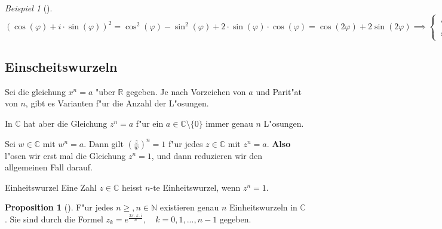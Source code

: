 \documentclass[11pt]{article}
\theoremstyle{remark}
\newtheorem{exa}{Beispiel}[section]
\theoremstyle{definition}
\newtheorem*{proposition}{Proposition}
\theoremstyle{remark}
\begin{document}
\begin{exa}[] \label{}\
\begin{equation*}
(\cos(\varphi)+i\cdot \sin(\varphi))^2 =\cos^2(\varphi)-\sin^2(\varphi)+2\cdot\sin(\varphi)\cdot\cos(\varphi) 
 = \cos(2\varphi) + 2\sin(2\varphi) 
 \implies 
\begin{cases}
\cos(2\varphi)=\cos^2(\varphi)-\sin^2(\varphi) \\
\sin(2\varphi)=2\cdot\sin(\varphi)\cdot\cos(\varphi)
\end{cases}
\end{equation*}
\end{exa}

\subsection{Einscheitswurzeln}
\label{sec:org0755105}
Sei die gleichung \(x^n=a\) "uber \(\mathbb{R}\) gegeben. Je nach Vorzeichen von
\(a\) und Parit"at von \(n\), gibt es Varianten f"ur die Anzahl der L"osungen.
\begin{relation}
In \(\mathbb{C}\) hat aber die Gleichung \(z^n=a\) f"ur ein \(a\in
\mathbb{C}\setminus \{0\}\) immer genau \(n\) L"osungen.
\end{relation}

Sei \(w\in \mathbb{C}\) mit \(w^n=a\). Dann gilt \((\frac{z}{w})^n=1\) f"ur jedes
\(z\in \mathbb{C}\) mit \(z^n=a\). \textbf{Also} l"osen wir erst mal die Gleichung \(z^n=1\),
und dann reduzieren wir den allgemeinen Fall darauf.

\begin{definition}{Einheitswurzel}{}
Eine Zahl \(z\in \mathbb{C}\) heisst \(n\text{-te}\) Einheitswurzel, wenn \(z^n=1\).
\end{definition}

\begin{proposition}[] \label{}
F"ur jedes \(n\geq, n\in\mathbb{N}\) existieren genau \(n\)
Einheitswurzeln in \(\mathbb{C}\). Sie sind durch die Formel
\(z_k=e^{\frac{2\pi\cdot k\cdot i}{n}},\quad k=0,1,...,n-1\) gegeben.
\end{proposition}
\end{document}
